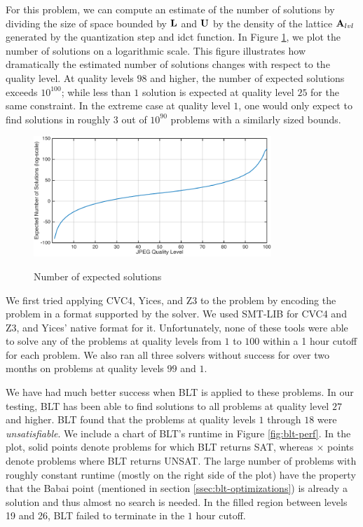 For this problem, we can compute an estimate of the number of solutions by
dividing the size of space bounded by $\mathbf{L}$ and $\mathbf{U}$ by the density
of the lattice $\mathbf{A}_{lvl}$ generated by the quantization step and idct
function.  In Figure \ref{fig:solution_count}, we plot the number of solutions
on a logarithmic scale. This figure illustrates how dramatically the estimated
number of solutions changes with respect to the quality level. At quality
levels \(98\) and higher, the number of expected solutions exceeds
\(10^{100}\); while less than \(1\) solution is expected at quality level
\(25\) for the same constraint. In the extreme case at quality level \(1\),
one would only expect to find solutions in roughly \(3\) out of \(10^{90}\)
problems with a similarly sized bounds.

\begin{figure}[htb]
  \centering
  \includegraphics[width=0.8\textwidth]{figures/solcount2.pdf}\\[0em]
  \caption{Number of expected solutions}
  \label{fig:solution_count}
\end{figure}

We first tried applying CVC4, Yices, and Z3 to the problem by encoding the
problem in a format supported by the solver. We used SMT-LIB for CVC4 and Z3,
and Yices' native format for it. Unfortunately, none of these tools were able to
solve any of the problems at quality levels from $1$ to $100$ within a 1 hour
cutoff for each problem.  We also ran all three solvers without success
for over two months on problems at quality levels \(99\) and \(1\).

We have had much better success when BLT is applied to these problems.  In our
testing, BLT has been able to find solutions to all problems at quality level
\(27\) and higher.  BLT found that the problems at quality levels
\(1\) through \(18\) were \emph{unsatisfiable}. We include a chart of BLT's
runtime in Figure \ref{fig:blt-perf}. In the plot, solid points denote
problems for which BLT returns SAT, whereas $\times$ points denote problems
where BLT returns UNSAT. The large number of problems with roughly constant
runtime (mostly on the right side of the plot) have the property that the
Babai point (mentioned in section \ref{ssec:blt-optimizations}) is already a
solution and thus almost no search is needed. In the filled region between levels
19 and 26, BLT failed to terminate in the $1$ hour cutoff.


